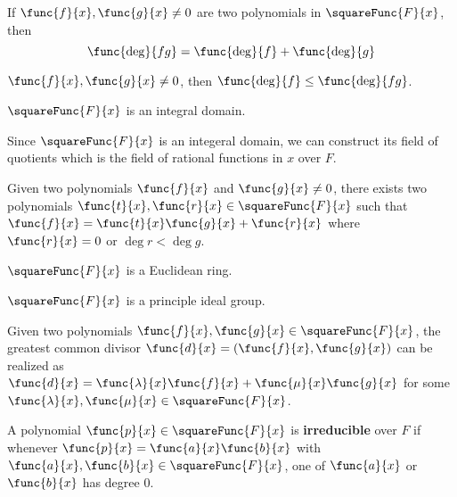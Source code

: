  \begin{lemma}
    If \(\func{f}{x}, \func{g}{x} \neq 0\) are two polynomials in \(\squareFunc{F}{x}\), then 
    \begin{equation*}
        \func{\deg}{fg}= \func{\deg}{f}  + \func{\deg}{g}
    \end{equation*}
 \end{lemma}

 \begin{corollary}
    \(\func{f}{x}, \func{g}{x} \neq 0\), then \( \func{\deg}{f}\leq \func{\deg}{fg}\).
 \end{corollary}

 \begin{corollary}
    \(\squareFunc{F}{x}\) is an integral domain.
 \end{corollary}

 Since \(\squareFunc{F}{x}\) is an integeral domain, we can construct its field of quotients which is the field of rational functions in \(x\) over \(F\).

 \begin{lemma}
    Given two polynomials \(\func{f}{x}\) and \(\func{g}{x} \neq 0\), there exists two polynomials \(\func{t}{x},\func{r}{x} \in \squareFunc{F}{x}\) such that \(\func{f}{x} = \func{t}{x} \func{g}{x} + \func{r}{x}\) where \(\func{r}{x} =0\) or \(\deg r < \deg g\).
 \end{lemma}

 \begin{theorem}
    \(\squareFunc{F}{x}\) is a Euclidean ring.
 \end{theorem}

 \begin{theorem}
    \(\squareFunc{F}{x}\) is a principle ideal group.
 \end{theorem}

 \begin{lemma}
    Given two polynomials \(\func{f}{x}, \func{g}{x} \in \squareFunc{F}{x}\), the greatest common divisor \(\func{d}{x} = (\func{f}{x}, \func{g}{x})\) can be realized as \(\func{d}{x} = \func{\lambda}{x} \func{f}{x} + \func{\mu}{x} \func{g}{x}\) for some \(\func{\lambda}{x}, \func{\mu}{x} \in \squareFunc{F}{x}\).
 \end{lemma}
 \begin{definition}
    A polynomial \(\func{p}{x} \in \squareFunc{F}{x}\) is \textbf{irreducible} over \(F\) if whenever \(\func{p}{x} = \func{a}{x} \func{b}{x}\) with \(\func{a}{x}, \func{b}{x} \in \squareFunc{F}{x}\), one of \(\func{a}{x}\) or \(\func{b}{x}\) has degree \(0\).
 \end{definition}

